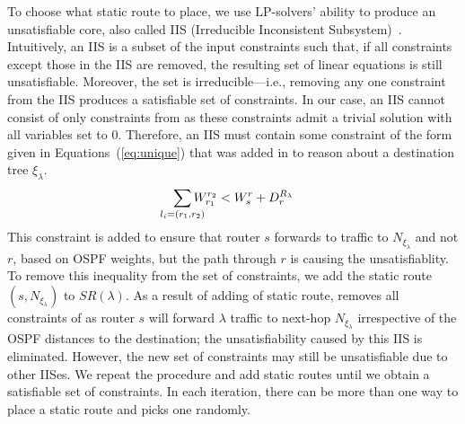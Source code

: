 To choose what static route to place, we use
LP-solvers' ability to produce an
unsatisfiable core, also called IIS (Irreducible Inconsistent Subsystem)~\cite{chinneck2007feasibility}. 
Intuitively, an IIS is a subset of the input constraints such that,
if all constraints except those in the IIS are removed, the resulting set of
linear equations is still unsatisfiable. Moreover, the set is irreducible---i.e., removing 
any one constraint from the IIS produces a satisfiable set of constraints. 
In our case, an IIS cannot consist of only 
constraints from  as these constraints
admit a trivial solution with all variables set to 0. 
Therefore, an IIS must contain some constraint of the form
given in  Equations~(\ref{eq:unique})
that was added in to reason about a destination tree $\xi_\lambda$. 
\[
\sum_{\mathclap{\substack{l_i=(r_1,r_2)}}} 
W_{r_1}^{r_2} < W_s^r + D_r^{R_\lambda}  
\]	
This constraint is added to ensure 
that router $s$ forwards to traffic to  
$N_{\xi_\lambda}$ and not $r$, based on OSPF weights,
but the path through $r$ is causing the unsatisfiablity. 
To remove this inequality from the set of constraints, 
we add the static route $(s,N_{\xi_\lambda})$ to $SR(\lambda)$.
As a result of adding of static route, \name removes 
all constraints of  as router $s$ 
will forward $\lambda$ traffic  to 
next-hop $N_{\xi_\lambda}$ irrespective of
the OSPF distances to the destination; the 
unsatisfiability caused by this IIS is eliminated. 
However, the new set of
constraints may still be unsatisfiable due to other IISes.
We repeat the procedure and add static routes
until we obtain a satisfiable set of
constraints. 
In each iteration, there can be more than one way to place a static route and
\name picks one randomly. 

